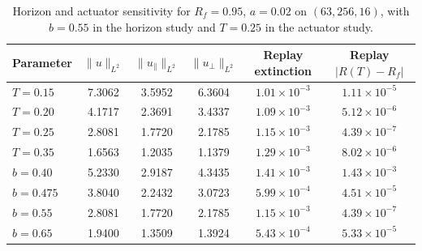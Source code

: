\begin{table}[tbp]
\caption{Horizon and actuator sensitivity for $R_f=0.95$, $a=0.02$ on $(63,256,16)$, with $b=0.55$ in the horizon study and $T=0.25$ in the actuator study.}
\label{tab:num_horizon}
\centering\footnotesize\setlength{\tabcolsep}{4pt}
\begin{tabular}{lccccc}
\toprule
Parameter & $\|u\|_{L^2}$ & $\|u_\parallel\|_{L^2}$ & $\|u_\perp\|_{L^2}$ & Replay extinction & Replay $|R(T)-R_f|$\\
\midrule
$T=0.15$ & 7.3062 & 3.5952 & 6.3604 & $1.01\times10^{-3}$ & $1.11\times10^{-5}$ \\
$T=0.20$ & 4.1717 & 2.3691 & 3.4337 & $1.09\times10^{-3}$ & $5.12\times10^{-6}$ \\
$T=0.25$ & 2.8081 & 1.7720 & 2.1785 & $1.15\times10^{-3}$ & $4.39\times10^{-7}$ \\
$T=0.35$ & 1.6563 & 1.2035 & 1.1379 & $1.29\times10^{-3}$ & $8.02\times10^{-6}$ \\
$b=0.40$ & 5.2330 & 2.9187 & 4.3435 & $1.41\times10^{-3}$ & $1.43\times10^{-3}$ \\
$b=0.475$ & 3.8040 & 2.2432 & 3.0723 & $5.99\times10^{-4}$ & $4.51\times10^{-5}$ \\
$b=0.55$ & 2.8081 & 1.7720 & 2.1785 & $1.15\times10^{-3}$ & $4.39\times10^{-7}$ \\
$b=0.65$ & 1.9400 & 1.3509 & 1.3924 & $5.43\times10^{-4}$ & $5.33\times10^{-5}$ \\
\bottomrule
\end{tabular}
\end{table}
